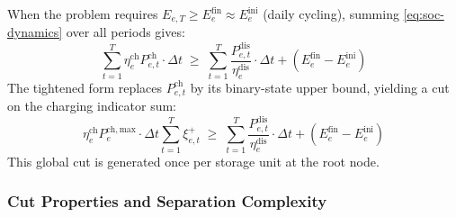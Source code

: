 When the problem requires $E_{e,T} \geq E^{\mathrm{fin}}_e \approx E^{\mathrm{ini}}_e$
(daily cycling), summing \eqref{eq:soc-dynamics} over all periods gives:
\begin{equation}\label{eq:soc-balance}
  \sum_{t=1}^{T} \eta^{\mathrm{ch}}_e P^{\mathrm{ch}}_{e,t} \cdot \Delta t
  \;\geq\;
  \sum_{t=1}^{T} \frac{P^{\mathrm{dis}}_{e,t}}{\eta^{\mathrm{dis}}_e} \cdot \Delta t
  + (E^{\mathrm{fin}}_e - E^{\mathrm{ini}}_e)
\end{equation}
The tightened form replaces $P^{\mathrm{ch}}_{e,t}$ by its binary-state upper
bound, yielding a cut on the charging indicator sum:
\begin{equation}\label{eq:cut-cyclic-soc}
  \boxed{
    \eta^{\mathrm{ch}}_e P^{\mathrm{ch,max}}_e \cdot \Delta t
    \sum_{t=1}^{T} \xi^{+}_{e,t}
    \;\geq\;
    \sum_{t=1}^{T} \frac{P^{\mathrm{dis}}_{e,t}}{\eta^{\mathrm{dis}}_e} \cdot \Delta t
    + (E^{\mathrm{fin}}_e - E^{\mathrm{ini}}_e)
  }
\end{equation}
This global cut is generated once per storage unit at the root node.

\subsubsection{Cut Properties and Separation Complexity}
\label{sec:cut-properties}

